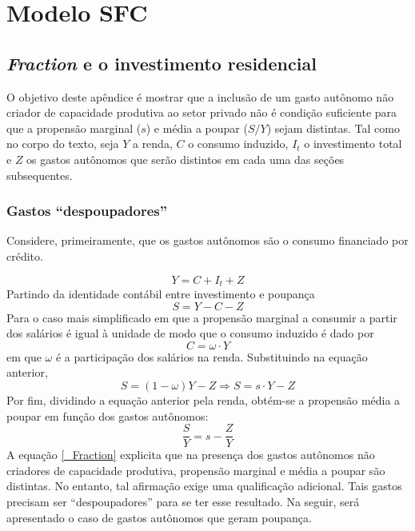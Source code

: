 \titleformat{\chapter}[display]{\normalfont\huge}{\appendixname{} \thechapter}{20pt}{\bfseries\huge}
\chapter{Modelo SFC}
\label{Append_Fraction}


\section{\textit{Fraction} e o investimento residencial}

O objetivo deste apêndice é mostrar que a inclusão de um gasto autônomo não criador de capacidade produtiva ao setor privado não é condição suficiente para que a propensão marginal ($s$) e média a poupar ($S/Y$) sejam distintas. Tal como no corpo do texto, seja $Y$ a renda, $C$ o consumo induzido, $I_t$ o investimento total e $Z$ os gastos autônomos que serão distintos em cada uma das seções subsequentes.

\subsection{Gastos ``despoupadores''}

Considere, primeiramente, que os gastos autônomos são o consumo financiado por crédito.

$$
Y = C + I_t + Z
$$
Partindo da identidade contábil entre investimento e poupança
$$
S = Y - C - Z
$$
Para o caso mais simplificado em que a propensão marginal a consumir a partir dos salários é igual à unidade de modo que o consumo induzido é dado por
$$
C = \omega\cdot Y
$$
em que $\omega$ é a participação dos salários na renda. Substituindo na equação anterior,
$$
S = (1- \omega)Y - Z \Rightarrow S = s\cdot Y - Z
$$
Por fim, dividindo a equação anterior pela renda, obtém-se a propensão média a poupar em função dos gastos autônomos:
\begin{equation}
\label{_Fraction}
    \frac{S}{Y} = s - \frac{Z}{Y}
\end{equation}
A equação \ref{_Fraction} explicita que na presença dos gastos autônomos não criadores de capacidade produtiva, propensão marginal e média a poupar são distintas. No entanto, tal afirmação exige uma qualificação adicional. Tais gastos precisam ser ``despoupadores'' para se ter esse resultado. Na seguir, será apresentado o caso de gastos autônomos que geram poupança. 

